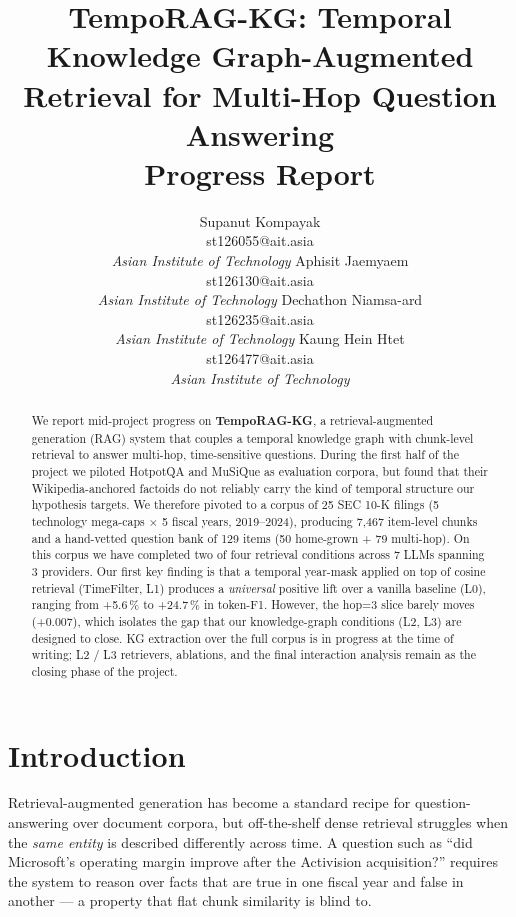 \documentclass[11pt]{article}
\title{TempoRAG-KG: Temporal Knowledge Graph-Augmented\\
Retrieval for Multi-Hop Question Answering\\
\large Progress Report}
\author{
  Supanut Kompayak \\
  st126055@ait.asia \\
  \textit{Asian Institute of Technology}
  \And
  Aphisit Jaemyaem \\
  st126130@ait.asia \\
  \textit{Asian Institute of Technology}
  \AND
  Dechathon Niamsa-ard \\
  st126235@ait.asia \\
  \textit{Asian Institute of Technology}
  \And
  Kaung Hein Htet \\
  st126477@ait.asia \\
  \textit{Asian Institute of Technology}
}
\begin{document}
\maketitle

\begin{abstract}
We report mid-project progress on \textbf{TempoRAG-KG}, a retrieval-augmented
generation (RAG) system that couples a temporal knowledge graph with
chunk-level retrieval to answer multi-hop, time-sensitive questions. During
the first half of the project we piloted HotpotQA and MuSiQue as evaluation
corpora, but found that their Wikipedia-anchored factoids do not reliably
carry the kind of temporal structure our hypothesis targets. We therefore
pivoted to a corpus of 25 SEC 10-K filings (5 technology mega-caps $\times$ 5
fiscal years, 2019--2024), producing 7{,}467 item-level chunks and a
hand-vetted question bank of 129 items (50 home-grown + 79 multi-hop).
On this corpus we have completed two of four retrieval conditions across
7 LLMs spanning 3 providers. Our first key finding is that a temporal
year-mask applied on top of cosine retrieval (TimeFilter, L1) produces a
\textit{universal} positive lift over a vanilla baseline (L0), ranging from
+5.6\,\% to +24.7\,\% in token-F1. However, the hop=3 slice barely moves
(+0.007), which isolates the gap that our knowledge-graph conditions (L2, L3)
are designed to close. KG extraction over the full corpus is in progress at
the time of writing; L2 / L3 retrievers, ablations, and the final
interaction analysis remain as the closing phase of the project.
\end{abstract}

\section{Introduction}
\label{sec:intro}

Retrieval-augmented generation \citep{lewis2020retrieval} has become a
standard recipe for question-answering over document corpora, but
off-the-shelf dense retrieval struggles when the \emph{same entity}
is described differently across time. A question such as ``did Microsoft's operating margin improve after
the Activision acquisition?'' requires the system to reason over facts
that are true in one fiscal year and false in another --- a property that
flat chunk similarity is blind to.
\end{document}
